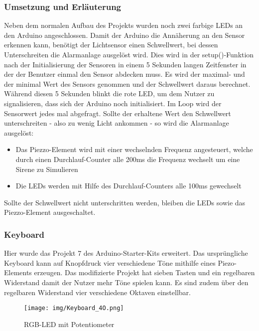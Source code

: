 \subsubsection{Umsetzung und Erläuterung}
Neben dem normalen Aufbau des Projekts wurden noch zwei farbige LEDs an den Arduino angeschlossen.
Damit der Arduino die Annäherung an den Sensor erkennen kann, benötigt der Lichtsensor einen Schwellwert, bei dessen Unterschreiten die Alarmanlage ausgelöst wird. Dies wird in der setup()-Funktion nach der Initialisierung der Sensoren in einem 5 Sekunden langen Zeitfenster in der der Benutzer einmal den Sensor abdecken muss. Es wird der maximal- und der minimal Wert des Sensors genommen und der Schwellwert daraus berechnet. Während diesen 5 Sekunden blinkt die rote LED, um dem Nutzer zu signalisieren, dass sich der Arduino noch initialisiert.
Im Loop wird der Sensorwert jedes mal abgefragt. Sollte der erhaltene Wert den Schwellwert unterschreiten - also zu wenig Licht ankommen - so wird die Alarmanlage ausgelöst: 
\begin{itemize}
\item Das Piezzo-Element wird mit einer wechselnden Frequenz angesteuert, welche durch einen Durchlauf-Counter alle 200ms die Frequenz wechselt um eine Sirene zu Simulieren
\item Die LEDs werden mit Hilfe des Durchlauf-Counters alle 100ms gewechselt
\end{itemize}
Sollte der Schwellwert nicht unterschritten werden, bleiben die LEDs sowie das Piezzo-Element ausgeschaltet.

\subsubsection{Keyboard}
Hier wurde das Projekt 7 des Arduino-Starter-Kits erweitert. Das ursprüngliche Keyboard kann auf Knopfdruck vier verschiedene Töne mithilfe eines Piezo-Elements erzeugen. Das modifizierte Projekt hat sieben Tasten und ein regelbaren Widerstand
damit der Nutzer mehr Töne spielen kann. Es sind zudem über den regelbaren Widerstand vier verschiedene Oktaven einstellbar.

\begin{figure}[h]
\begin{center}
\texttt{[image: img/Keyboard\_4O.png]}
\caption{RGB-LED mit Potentiometer}
\label{rgb_project}
\end{center}
\end{figure}

